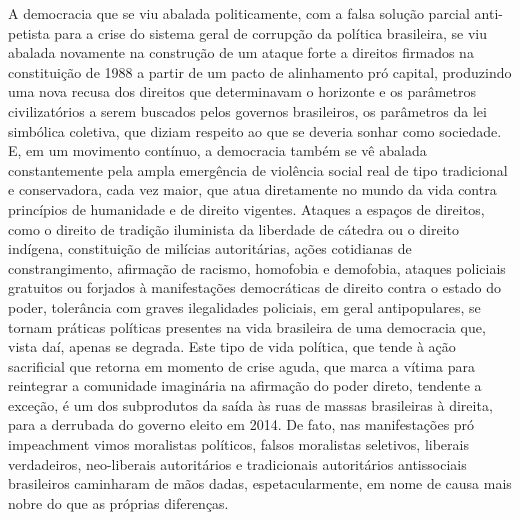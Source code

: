 A democracia que se viu abalada politicamente, com a falsa solução
parcial anti-petista para a crise do sistema geral de corrupção da
política brasileira, se viu abalada novamente na construção de um ataque
forte a direitos firmados na constituição de 1988 a partir de um pacto
de alinhamento pró capital, produzindo uma nova recusa dos direitos que
determinavam o horizonte e os parâmetros civilizatórios a serem buscados
pelos governos brasileiros, os parâmetros da lei simbólica coletiva, que
diziam respeito ao que se deveria sonhar como sociedade. E, em um
movimento contínuo, a democracia também se vê abalada constantemente
pela ampla emergência de violência social real de tipo tradicional e
conservadora, cada vez maior, que atua diretamente no mundo da vida
contra princípios de humanidade e de direito vigentes. Ataques a espaços
de direitos, como o direito de tradição iluminista da liberdade de
cátedra ou o direito indígena, constituição de milícias autoritárias,
ações cotidianas de constrangimento, afirmação de racismo, homofobia e
demofobia, ataques policiais gratuitos ou forjados à manifestações
democráticas de direito contra o estado do poder, tolerância com graves
ilegalidades policiais, em geral antipopulares, se tornam práticas
políticas presentes na vida brasileira de uma democracia que, vista daí,
apenas se degrada. Este tipo de vida política, que tende à ação
sacrificial que retorna em momento de crise aguda, que marca a vítima
para reintegrar a comunidade imaginária na afirmação do poder direto,
tendente a exceção, é um dos subprodutos da saída às ruas de massas
brasileiras à direita, para a derrubada do governo eleito em 2014. De
fato, nas manifestações pró impeachment vimos moralistas políticos,
falsos moralistas seletivos, liberais verdadeiros, neo-liberais
autoritários e tradicionais autoritários antissociais brasileiros
caminharam de mãos dadas, espetacularmente, em nome de causa mais nobre
do que as próprias diferenças.

